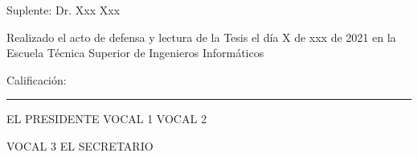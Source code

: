 \documentclass[twoside,11pt]{Latex/Classes/PhDthesisPSnPDF}
\begin{document}
\vspace{5mm}
Suplente: \hspace{1.5mm} Dr. Xxx Xxx

\vspace{10mm}
\noindent Realizado el acto de defensa y lectura de la Tesis el d\'{i}a X de xxx de 2021 en la Escuela T\'ecnica Superior de Ingenieros Inform\'aticos

\vspace{5mm}
\noindent Calificaci\'{o}n: \rule{123mm}{0.2mm}
\vspace{20mm}

EL PRESIDENTE \hspace{30mm} VOCAL 1 \hspace{30mm} VOCAL 2

\vspace{30mm}
\hspace{15mm} VOCAL 3 \hspace{45mm} EL SECRETARIO

%




\cleardoublepage


\cleardoublepage



\cleardoublepage


\cleardoublepage
\setcounter{secnumdepth}{3} %
\setcounter{tocdepth}{3}    %

\tableofcontents           %




\listoffigures	%
\end{document}
